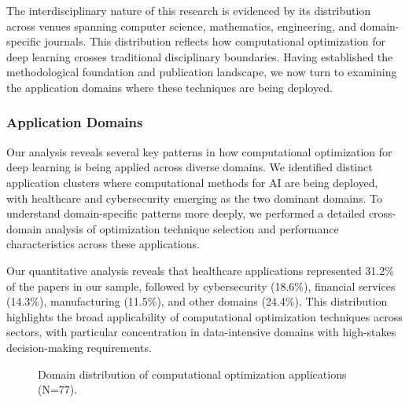 \documentclass[a4paper,12pt]{acm/acmart}
\begin{document}
The interdisciplinary nature of this research is evidenced by its distribution across venues spanning computer science, mathematics, engineering, and domain-specific journals. This distribution reflects how computational optimization for deep learning crosses traditional disciplinary boundaries. Having established the methodological foundation and publication landscape, we now turn to examining the application domains where these techniques are being deployed.

\subsubsection{Application Domains}\label{subsubsec:overview-of-included-studies:application-domains}
Our analysis reveals several key patterns in how computational optimization for deep learning is being applied across diverse domains. We identified distinct application clusters where computational methods for AI are being deployed, with healthcare and cybersecurity emerging as the two dominant domains. To understand domain-specific patterns more deeply, we performed a detailed cross-domain analysis of optimization technique selection and performance characteristics across these applications.

Our quantitative analysis reveals that healthcare applications represented 31.2\% of the papers in our sample, followed by cybersecurity (18.6\%), financial services (14.3\%), manufacturing (11.5\%), and other domains (24.4\%). This distribution highlights the broad applicability of computational optimization techniques across sectors, with particular concentration in data-intensive domains with high-stakes decision-making requirements.

\begin{figure}[ht]
    \centering
    \caption{Domain distribution of computational optimization applications (N=77).}
    \label{fig:domain_distribution}
\end{figure}
\end{document}
